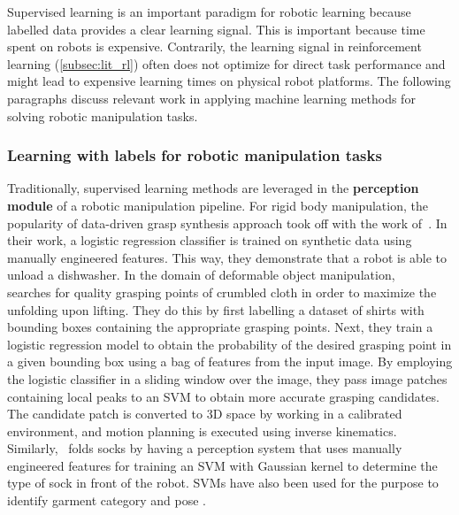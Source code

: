 \documentclass[\home/main.tex]{subfiles}
\begin{document}


Supervised learning is an important paradigm for robotic learning because labelled data provides a clear learning signal. This is important because time spent on robots is expensive. Contrarily, the learning signal in reinforcement learning (\cref{subsec:lit_rl}) often does not optimize for direct task performance and might lead to expensive learning times on physical robot platforms. The following paragraphs discuss relevant work in applying machine learning methods for solving robotic manipulation tasks. 

\subsubsection{Learning with labels for robotic manipulation tasks}
Traditionally, supervised learning methods are leveraged in the \textbf{perception module} of a robotic manipulation pipeline. For rigid body manipulation, the popularity of data-driven grasp synthesis approach took off with the work of~\textcite{Saxena2008}. In their work, a logistic regression classifier is trained on synthetic data using manually engineered features. This way, they demonstrate that a robot is able to unload a dishwasher. In the domain of deformable object manipulation, ~\textcite{Ramisa2012} searches for quality grasping points of crumbled cloth in order to maximize the unfolding upon lifting. They do this by first labelling a dataset of shirts with bounding boxes containing the appropriate grasping points. Next, they train a logistic regression model to obtain the probability of the desired grasping point in a given bounding box using a bag of features from the input image. By employing the logistic classifier in a sliding window over the image, they pass image patches containing local peaks to an \gls{SVM} to obtain more accurate grasping candidates. The candidate patch is converted to 3D space by working in a calibrated environment, and motion planning is executed using inverse kinematics. Similarly,~\textcite{Wang2011} folds socks by having a perception system that uses manually engineered features for training an \gls{SVM} with Gaussian kernel to determine the type of sock in front of the robot. \Glspl{SVM} have also been used for the purpose to identify garment category and pose \autocite{Li2014, li2014volum}.
\end{document}
